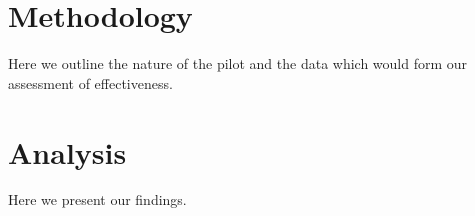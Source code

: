 \documentclass{amsart}
\begin{document}
%





\section{Methodology}
Here we outline the nature of the pilot and the data which would form our assessment of effectiveness.

\section{Analysis}
Here we present our findings.
\end{document}
